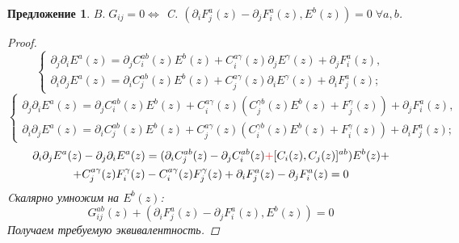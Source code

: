 \documentclass[12pt]{article}
\newtheorem{predl}[theorem]{Предложение}
\theoremstyle{definition}
\begin{document}
\begin{predl}
    $B.\;G_{ij}=0\Leftrightarrow$ C. $(\partial_iF_j^a(z)-\partial_jF_i^a(z),E^b(z))=0\;\forall a,b$.
    \begin{proof}
        \begin{equation}
            \begin{cases}
                \partial_j\partial_iE^a(z)=\partial_jC_i^{ab}(z)E^b(z)+C_i^{a\gamma}(z)\partial_jE^\gamma(z)+\partial_jF_i^a(z),\\
                \partial_i\partial_jE^a(z)=\partial_iC_j^{ab}(z)E^b(z)+C_j^{a\gamma}(z)\partial_iE^\gamma(z)+\partial_iF_j^a(z);
            \end{cases}
        \end{equation}
        \begin{equation}
            \begin{cases}
                \partial_j\partial_iE^a(z)=\partial_jC_i^{ab}(z)E^b(z)+C_i^{a\gamma}(z)(C_j^{\gamma b}(z)E^b(z)+F_j^\gamma(z))+\partial_jF_i^a(z),\\
                \partial_i\partial_jE^a(z)=\partial_iC_j^{ab}(z)E^b(z)+C_j^{a\gamma}(z)(C_i^{\gamma b}(z)E^b(z)+F_i^\gamma(z))+\partial_iF_j^a(z);
            \end{cases}
        \end{equation}
        \begin{multline}
            \partial_i\partial_jE^a(z)-\partial_j\partial_iE^a(z)=(\partial_iC_j^{ab}(z)-\partial_jC_i^{ab}(z)\textcolor{red}{+}[C_i(z),C_j(z)]^{ab})E^b(z)+\\+C^{a\gamma}_j(z)F_i^\gamma(z)-C_i^{a\gamma}(z)F^\gamma_j(z)+\partial_iF_j^a(z)-\partial_jF_i^a(z)=0
        \end{multline}
        Cкалярно умножим на $E^b(z)$:
        \begin{equation}
            G^{ab}_{ij}(z)+(\partial_iF_j^a(z)-\partial_jF_i^a(z),E^b(z))=0
        \end{equation}
        Получаем требуемую эквивалентность.
    \end{proof}
\end{predl}
\end{document}
